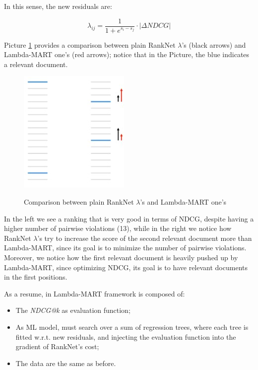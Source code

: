 In this sense, the new residuals are:

$$
\lambda_{ij} = \frac{1}{1 + e^{s_i - s_j}} \cdot |\Delta NDCG|
$$

Picture \ref{lambda mart} provides a comparison between plain RankNet $\lambda$'s (black arrows) and Lambda-MART one's (red arrows); notice that in the Picture, the blue indicates a relevant document. 

\begin{figure}[h!]
		\centering
        \includegraphics[scale = 2.5]{img/lambda mart.jpg}
		\label{lambda mart}
        \caption{Comparison between plain RankNet $\lambda$'s and Lambda-MART one's}
\end{figure}

In the left we see a ranking that is very good in terms of NDCG, despite having a higher number of pairwise violations (13), while in the right we notice how RankNet $\lambda$'s try to increase the score of the second relevant document more than Lambda-MART, since its goal is to minimize the number of pairwise violations. Moreover, we notice how the first relevant document is heavily pushed up by Lambda-MART, since optimizing NDCG, its goal is to have relevant documents in the first positions.

As a resume, in Lambda-MART framework is composed of:

\begin{itemize}
    \item The \textit{NDCG@k} as evaluation function;
    \item As ML model, must search over a sum of regression trees, where each tree is fitted w.r.t. new residuals, and injecting the evaluation function into the gradient of RankNet's cost;
    \item The data are the same as before.
\end{itemize}